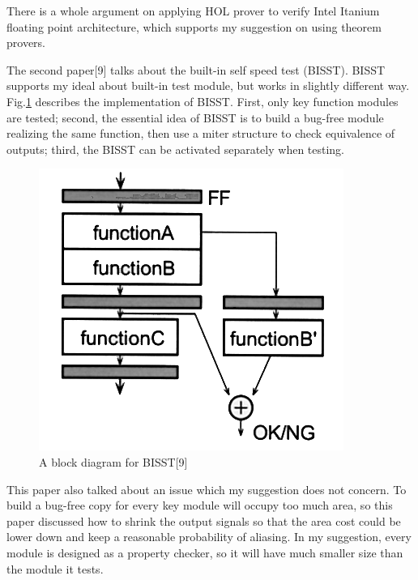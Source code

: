 \documentclass[11pt,twoside, onecolumn]{IEEEtran}
\begin{document}
There is a whole argument on applying HOL prover to verify Intel Itanium floating point architecture,
which supports my suggestion on using theorem provers.

The second paper[9] talks about the built-in self speed test (BISST). BISST supports my ideal about
built-in test module, but works in slightly different way. Fig.\ref{fig:BISST} describes the implementation 
of BISST. First, only key function modules are tested; second, the essential idea of BISST is to 
build a bug-free module realizing the same function, then use a miter structure to check equivalence
of outputs; third, the BISST can be activated separately when testing.

\begin{figure}[hbt]
	\begin{center}
	\includegraphics[scale=0.4]{BISST.png}
	\end{center}
	\caption{A block diagram for BISST[9]}
	\label{fig:BISST}
\end{figure}

This paper also talked about an issue which my suggestion does not concern. To build a 
bug-free copy for every key module will occupy too much area, so this paper discussed how to
shrink the output signals so that the area cost could be lower down and keep a reasonable probability
of aliasing. In my suggestion, every module is designed as a property checker, so it will have much
smaller size than the module it tests. 
\end{document}
